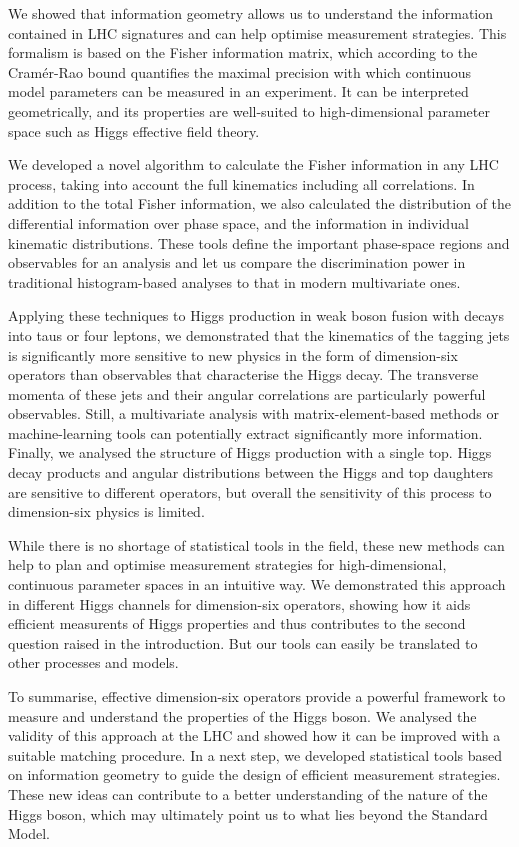 We showed that information geometry allows us to understand the
information contained in LHC signatures and can help optimise
measurement strategies. This formalism is based on the Fisher
information matrix, which according to the Cram\'er-Rao bound
quantifies the maximal precision with which continuous model
parameters can be measured in an experiment. It can be interpreted
geometrically, and its properties are well-suited to high-dimensional
parameter space such as Higgs effective field theory.

We developed a novel algorithm to calculate the Fisher information in
any LHC process, taking into account the full kinematics including all
correlations. In addition to the total Fisher information, we also
calculated the distribution of the differential information over phase
space, and the information in individual kinematic
distributions. These tools define the important phase-space regions
and observables for an analysis and let us compare the discrimination
power in traditional histogram-based analyses to that in modern
multivariate ones.

Applying these techniques to Higgs production in weak boson fusion
with decays into taus or four leptons, we demonstrated that the
kinematics of the tagging jets is significantly more sensitive to new
physics in the form of dimension-six operators than observables that
characterise the Higgs decay.  The transverse momenta of these jets
and their angular correlations are particularly powerful
observables. Still, a multivariate analysis with matrix-element-based
methods or machine-learning tools can potentially extract
significantly more information. Finally, we analysed the structure of
Higgs production with a single top. Higgs decay products and angular
distributions between the Higgs and top daughters are sensitive to
different operators, but overall the sensitivity of this process to
dimension-six physics is limited.

%
While there is no shortage of statistical tools in the field, these
new methods can help to plan and optimise measurement strategies for
high-dimensional, continuous parameter spaces in an intuitive way.  We
demonstrated this approach in different Higgs channels for
dimension-six operators, showing how it aids efficient measurents of
Higgs properties and thus contributes to the second question raised in
the introduction. But our tools can easily be translated to other
processes and models.

\newparagraph
%
To summarise, effective dimension-six operators provide a powerful
framework to measure and understand the properties of the Higgs
boson. We analysed the validity of this approach at the LHC and showed
how it can be improved with a suitable matching procedure. In a next
step, we developed statistical tools based on information geometry to
guide the design of efficient measurement strategies. These new ideas
can contribute to a better understanding of the nature of the Higgs
boson, which may ultimately point us to what lies beyond the Standard
Model.

